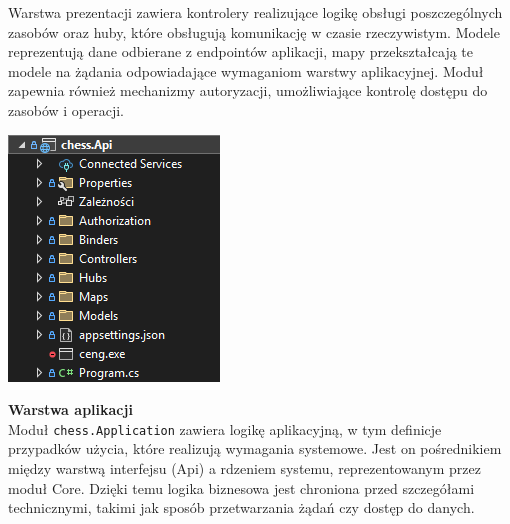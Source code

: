 \documentclass[twoside]{projektInzynierskiMS1}
\begin{document}
\vspace{0.5cm}
\noindent
\begin{minipage}[t]{0.5\textwidth}
    \vspace{0pt}
    \justifying 
    \noindent
    Warstwa prezentacji zawiera kontrolery realizujące logikę obsługi poszczególnych zasobów oraz huby, które obsługują komunikację w czasie rzeczywistym. Modele reprezentują dane odbierane z endpointów aplikacji, mapy przekształcają te modele na żądania odpowiadające wymaganiom warstwy aplikacyjnej. Moduł zapewnia również mechanizmy autoryzacji, umożliwiające kontrolę dostępu do zasobów i operacji.
\end{minipage}
\hfill
\begin{minipage}[t]{0.4\textwidth}
    \vspace{0pt}
    \centering
    \includegraphics[width=\linewidth]{images/struktura_back_api.png}
\end{minipage}
\vspace{0.5cm}

\noindent \textbf{Warstwa aplikacji}\\
Moduł \texttt{chess.Application} zawiera logikę aplikacyjną, w tym definicje przypadków użycia, które realizują wymagania systemowe. Jest on pośrednikiem między warstwą interfejsu (Api) a rdzeniem systemu, reprezentowanym przez moduł Core. Dzięki temu logika biznesowa jest chroniona przed szczegółami technicznymi, takimi jak sposób przetwarzania żądań czy dostęp do danych.
\end{document}
